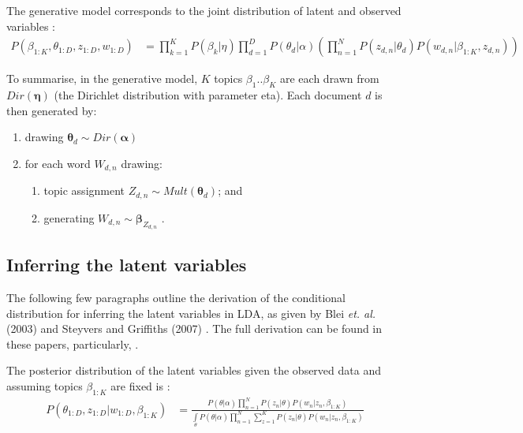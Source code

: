 The generative model corresponds to the joint distribution of latent and observed variables \cite{blei2011introduction,blei2003latent}:
\begin{align}
P(\beta_{1:K},\theta_{1:D},z_{1:D},w_{1:D}) 
&= \prod_{k=1}^K P(\beta_k|\eta) \prod_{d=1}^D P(\theta_d|\alpha)
\left(\prod_{n=1}^N P(z_{d,n}|\theta_d)P(w_{d,n}|\beta_{1:K},z_{d,n})\right)
\end{align}

To summarise, in the generative model, $K$ topics $\beta_1 .. \beta_K$ are each drawn from $Dir(\boldsymbol{\eta})$ (the Dirichlet distribution with parameter eta). Each document $d$ is then generated by:
\begin{enumerate}
\item drawing $\boldsymbol{\theta}_d \sim Dir(\boldsymbol{\alpha})$
\item for each word $W_{d,n}$ drawing:
\begin{enumerate}
\item topic assignment $Z_{d,n} \sim Mult(\boldsymbol{\theta}_d)$; and
\item generating $W_{d,n} \sim \boldsymbol{\beta}_{Z_{d,n}}$ \cite{blei2011introduction,blei2003latent,steyvers2007probabilistic}.
\end{enumerate}
\end{enumerate}

\subsection{Inferring the latent variables}

The following few paragraphs outline the derivation of the conditional distribution for inferring the latent variables in LDA, as given by Blei \textit{et. al.} (2003) and Steyvers and Griffiths (2007) \cite{blei2003latent,steyvers2007probabilistic}. The full derivation can be found in these papers, particularly, \cite{blei2003latent}. 

The posterior distribution of the latent variables given the observed data and assuming topics $\beta_{1:K}$ are fixed is \cite{blei2011introduction,blei2003latent}: 
\begin{align}
P(\theta_{1:D},z_{1:D}|w_{1:D},\beta_{1:K})
&= \frac{P(\theta|\alpha)\prod_{n=1}^N P(z_n|\theta)P(w_n|z_n,\beta_{1:K})}
{\int\limits_{\theta} P(\theta|\alpha)\prod_{n=1}^N \sum_{z=1}^K P(z_n|\theta)P(w_n|z_n, \beta_{1:K})}
\end{align}

